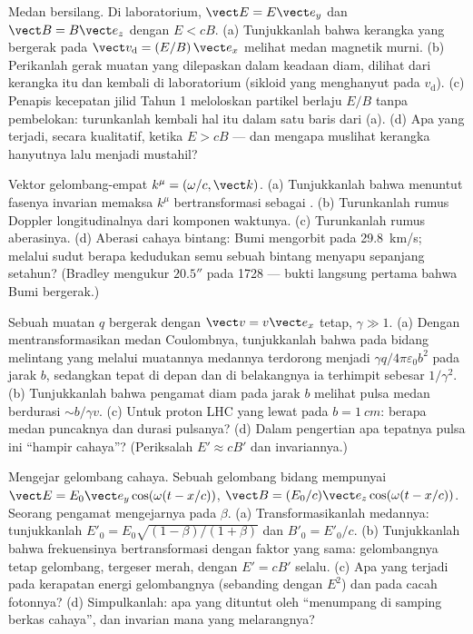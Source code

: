 \begin{exercise}[$\star\star$]\label{exo:b3:covariant-electromagnetism:7}
Medan bersilang. Di laboratorium, $\vect E = E\vect e_y$ dan $\vect B =
B\vect e_z$ dengan $E < cB$. (a) Tunjukkanlah bahwa kerangka yang
bergerak pada $\vect v_{\text{d}} = (E/B)\,\vect e_x$ melihat medan
magnetik murni. (b) Perikanlah gerak muatan yang dilepaskan dalam
keadaan diam, dilihat dari kerangka itu dan kembali di laboratorium
(sikloid yang menghanyut pada $v_{\text{d}}$). (c)
Penapis kecepatan jilid Tahun 1 meloloskan partikel berlaju $E/B$ tanpa
pembelokan: turunkanlah kembali hal itu dalam satu baris dari (a). (d)
Apa yang terjadi, secara kualitatif, ketika $E > cB$ --- dan mengapa
muslihat kerangka hanyutnya lalu menjadi mustahil?
\end{exercise}

\begin{exercise}[$\star\star$]\label{exo:b3:covariant-electromagnetism:8}
Vektor gelombang-empat $k^\mu = (\omega/c, \vect k)$. (a) Tunjukkanlah
bahwa menuntut fasenya invarian memaksa $k^\mu$ bertransformasi sebagai
. (b) Turunkanlah rumus Doppler longitudinalnya dari
komponen waktunya. (c) Turunkanlah rumus aberasinya. (d) Aberasi cahaya
bintang: Bumi mengorbit pada \qty{29.8}{km/s}; melalui sudut berapa
kedudukan semu sebuah bintang menyapu sepanjang setahun? (Bradley
mengukur $20.5''$ pada 1728 --- bukti langsung pertama bahwa Bumi bergerak.)
\end{exercise}

\begin{exercise}[$\star\star$]\label{exo:b3:covariant-electromagnetism:9}
Sebuah muatan $q$ bergerak dengan $\vect v = v\vect e_x$ tetap, $\gamma \gg
1$. (a) Dengan mentransformasikan medan Coulombnya, tunjukkanlah bahwa
pada bidang melintang yang melalui muatannya medannya terdorong menjadi
$\gamma
q/4\pi\varepsilon_0b^2$ pada jarak $b$, sedangkan tepat di depan dan di
belakangnya ia terhimpit sebesar $1/\gamma^2$. (b) Tunjukkanlah bahwa
pengamat diam pada jarak $b$ melihat pulsa medan berdurasi
$\sim b/\gamma v$. (c) Untuk proton LHC yang lewat pada $b = \qty{1}{cm}$:
berapa medan puncaknya dan durasi pulsanya? (d) Dalam pengertian apa
tepatnya pulsa ini ``hampir cahaya''? (Periksalah $E' \approx cB'$ dan
invariannya.)
\end{exercise}

\begin{exercise}[$\star\star\star$]\label{exo:b3:covariant-electromagnetism:10}
Mengejar gelombang cahaya. Sebuah gelombang bidang mempunyai $\vect E = E_0\vect e_y
\cos(\omega(t - x/c))$, $\vect B = (E_0/c)\vect e_z\cos(\omega(t -
x/c))$. Seorang pengamat mengejarnya pada $\beta$. (a)
Transformasikanlah medannya: tunjukkanlah
$E'_0 = E_0\sqrt{(1-\beta)/(1+\beta)}$ dan $B'_0 = E'_0/c$. (b)
Tunjukkanlah bahwa frekuensinya bertransformasi dengan faktor yang
sama: gelombangnya tetap gelombang, tergeser merah, dengan $E' = cB'$
selalu. (c) Apa yang terjadi pada kerapatan energi gelombangnya
(sebanding dengan $E^2$) dan pada cacah fotonnya? (d) Simpulkanlah: apa
yang dituntut oleh ``menumpang di samping berkas cahaya'', dan invarian
mana yang melarangnya?
\end{exercise}

